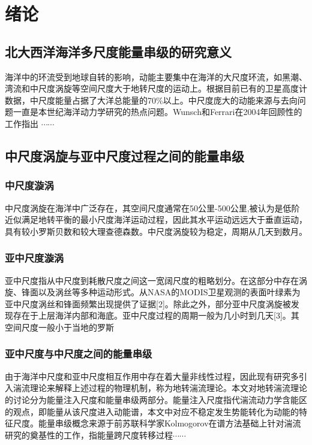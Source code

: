 

\chapter{绪论}

\section{北大西洋海洋多尺度能量串级的研究意义}

海洋中的环流受到地球自转的影响，动能主要集中在海洋的大尺度环流，如黑潮、湾流和中尺度涡旋等空间尺度大于地转尺度的运动上。根据目前已有的卫星高度计数据，中尺度能量占据了大洋总能量的70\%以上。中尺度庞大的动能来源与去向问题一直是本世纪海洋动力学研究的热点问题。Wunsch和Ferrari在2004年回顾性的工作指出 $\cdots\cdots$ 


\section{中尺度涡旋与亚中尺度过程之间的能量串级}

\subsection{中尺度漩涡}

中尺度涡旋在海洋中广泛存在，其空间尺度通常在50公里-500公里,被认为是低阶近似满足地转平衡的最小尺度海洋运动过程，因此其水平运动远远大于垂直运动，具有较小罗斯贝数和较大理查德森数。中尺度涡旋较为稳定，周期从几天到数月。

\subsection{亚中尺度漩涡}

亚中尺度指从中尺度到耗散尺度之间这一宽阔尺度的粗略划分。在这部分中存在涡旋、锋面以及涡丝等多种运动形式。从NASA的MODIS卫星观测的表面叶绿素为亚中尺度涡丝和锋面频繁出现提供了证据[2]。除此之外，部分亚中尺度涡旋被发现存在于上层海洋内部和海底。亚中尺度过程的周期一般为几小时到几天[3]。其空间尺度一般小于当地的罗斯

\subsection{亚中尺度与中尺度之间的能量串级}

由于海洋中尺度和亚中尺度相互作用中存在着大量非线性过程，因此现有研究多引入湍流理论来解释上述过程的物理机制，称为地转湍流理论。本文对地转湍流理论的讨论分为能量注入尺度和能量串级两部分。能量注入尺度指代湍流动力学含能区的观点，即能量从该尺度进入动能谱，本文中对应不稳定发生势能转化为动能的特征尺度。能量串级概念来源于前苏联科学家Kolmogorov在谱方法基础上针对湍流研究的奠基性的工作，指能量跨尺度转移过程$\cdots\cdots$

